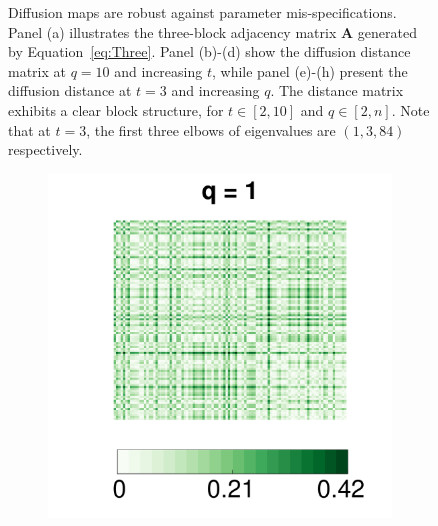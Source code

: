\documentclass[12pt]{article}
\theoremstyle{definition}
\begin{document}
\begin{figure}[!ht]
\begin{subfigure}[b]{0.23\textwidth}
			\caption{}
			\label{fig:q10}
		\end{subfigure}
		\caption{Diffusion maps are robust against parameter mis-specifications. Panel (a) illustrates the three-block adjacency matrix $\mathbf{A}$ generated by Equation~\ref{eq:Three}. Panel (b)-(d) show the diffusion distance matrix at $q=10$ and increasing $t$, while panel (e)-(h) present the diffusion distance at $t=3$ and increasing $q$. The distance matrix exhibits a clear block structure, for $t \in [2,10]$ and $q \in [2,n]$. Note that at $t=3$, the first three elbows of eigenvalues are $(1,3,84)$ respectively.}
		\label{fig:diffusions}
	\end{figure}
	
	\begin{figure}[!ht]
		\centering
		\begin{subfigure}[b]{0.23\textwidth}
			\includegraphics[width=\textwidth]{../Figure/E1.pdf}
			\caption{}
			\label{fig:e1}
		\end{subfigure}
		\begin{subfigure}[b]{0.23\textwidth}

\end{subfigure}
\end{figure}
\end{document}
